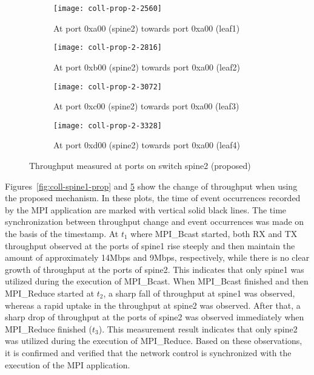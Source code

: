 \begin{figure}
    \begin{subfigure}{.45\linewidth}
        \texttt{[image: coll-prop-2-2560]}
        \caption{At port 0xa00 (spine2) \newline towards port 0xa00 (leaf1)}%
        \label{fig:spine2-leaf1-prop}
    \end{subfigure}
    \begin{subfigure}{.45\linewidth}
        \texttt{[image: coll-prop-2-2816]}
        \caption{At port 0xb00 (spine2) \newline towards port 0xa00 (leaf2)}%
        \label{fig:spine2-leaf2-prop}
    \end{subfigure}
    \begin{subfigure}{.45\linewidth}
        \texttt{[image: coll-prop-2-3072]}
        \caption{At port 0xc00 (spine2) \newline towards port 0xa00 (leaf3)}%
        \label{fig:spine2-leaf3-prop}
    \end{subfigure}
    \begin{subfigure}{.45\linewidth}
        \texttt{[image: coll-prop-2-3328]}
        \caption{At port 0xd00 (spine2) \newline towards port 0xa00 (leaf4)}%
        \label{fig:spine2-leaf4-prop}
    \end{subfigure}
    \caption{Throughput measured at ports on switch spine2 (proposed)}%
    \label{fig:coll-spine2-prop}
\end{figure}


Figures~\ref{fig:coll-spine1-prop} and \ref{fig:coll-spine2-prop} show
the change of throughput when using the proposed mechanism. In these
plots, the time of event occurrences recorded by the MPI application are
marked with vertical solid black lines. The time synchronization between
throughput change and event occurrences was made on the basis of the
timestamp. At \(t_1\) where MPI\_Bcast started, both RX and TX
throughput observed at the ports of spine1 rise steeply and then
maintain the amount of approximately 14Mbps and 9Mbps, respectively,
while there is no clear growth of throughput at the ports of spine2.
This indicates that only spine1 was utilized during the execution of
MPI\_Bcast. When MPI\_Bcast finished and then MPI\_Reduce started at
\(t_2\), a sharp fall of throughput at spine1 was observed, whereas a
rapid uptake in the throughput at spine2 was observed. After that, a
sharp drop of throughput at the ports of spine2 was observed immediately
when MPI\_Reduce finished (\(t_3\)). This measurement result indicates
that only spine2 was utilized during the execution of MPI\_Reduce. Based
on these observations, it is confirmed and verified that the network
control is synchronized with the execution of the MPI application.

